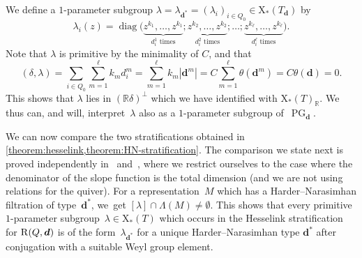 \documentclass[11pt]{article}
\theoremstyle{plain}
\theoremstyle{definition}
\DeclareMathOperator\PG{PG}
\newcommand\cocharacters{\ensuremath{\mathrm{X}_*}}
\newcommand\tuple[1]{\ensuremath{{\boldsymbol{#1}}}}
\begin{document}
We define a $1$-parameter subgroup $\lambda = \lambda_{\tuple{d}^*} = (\lambda_i)_{i \in Q_0} \in \cocharacters(T_{\tuple{d}})$ by
\begin{equation}
\label{equation:HN-type-1-PS-correspondence}
\lambda_i(z) = \operatorname{diag}\big( \underbrace{z^{k_1},\ldots,z^{k_1}}_{d_i^1 \text{ times}}; \underbrace{z^{k_2},\ldots,z^{k_2}}_{d_i^2 \text{ times}};\ldots; \underbrace{z^{k_\ell},\ldots,z^{k_\ell}}_{d_i^\ell \text{ times}} \big).
\end{equation}
Note that $\lambda$ is primitive by the minimality of $C$,
and that
\begin{equation*}
(\delta,\lambda)
=\sum_{i \in Q_0} \sum_{m=1}^\ell k_md_i^m
=\sum_{m=1}^\ell k_m|\tuple{d}^m|
=C\sum_{m=1}^\ell \theta(\tuple{d}^m)
=C\theta(\tuple{d})
= 0.
\end{equation*}
This shows that $\lambda$ lies in $(\mathbb{R}\delta)^\bot$
which we have identified with $\cocharacters(T)_\mathbb{R}$.
We thus can, and will, interpret~$\lambda$ also as a $1$-parameter subgroup of~$\PG_{\tuple{d}}$.

We can now compare the two stratifications obtained in \cref{theorem:hesselink,theorem:HN-stratification}.
The comparison we state next is proved independently in~\cite[Th.\,3.8]{MR3871820} and~\cite[Th.\,6.3]{MR3199484},
where we restrict ourselves to the case where the denominator of the slope function
is the total dimension (and we are not using relations for the quiver).
For a representation~$M$ which has a Harder--Narasimhan filtration of type~$\tuple{d}^*$, we~get $[\lambda] \cap \Lambda(M) \neq \emptyset$.
This shows that every primitive $1$-parameter subgroup~$\lambda \in \cocharacters(T)$
which occurs in the Hesselink stratification for $\repspace{Q,\tuple{d}}$
is of the form~$\lambda_{\tuple{d}^*}$
for a unique Harder--Narasimhan type $\tuple{d}^*$
after conjugation with a suitable Weyl group element.
\end{document}
